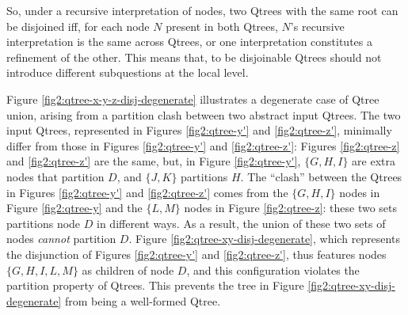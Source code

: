 So, under a recursive interpretation of nodes, two Qtrees with the same root can be disjoined iff, for each node $N$ present in both Qtrees, $N$'s recursive interpretation is the same across Qtrees, or one interpretation constitutes a refinement of the other. This means that, to be disjoinable Qtrees should not introduce different subquestions at the local level.

Figure \ref{fig2:qtree-x-y-z-disj-degenerate} illustrates a degenerate case of Qtree union, arising from a partition clash between two abstract input Qtrees. The two input Qtrees, represented in Figures \ref{fig2:qtree-y'} and \ref{fig2:qtree-z'}, minimally differ from those in Figures \ref{fig2:qtree-y'} and \ref{fig2:qtree-z'}: Figures \ref{fig2:qtree-z} and \ref{fig2:qtree-z'} are the same, but, in Figure \ref{fig2:qtree-y'}, $\lbrace G, H, I \rbrace$ are extra nodes that partition $D$, and $\lbrace J, K \rbrace$ partitions $H$. The ``clash'' between the Qtrees in Figures \ref{fig2:qtree-y'} and \ref{fig2:qtree-z'} comes from the $\lbrace G, H, I \rbrace$ nodes in Figure \ref{fig2:qtree-y} and the $\lbrace L, M \rbrace$ nodes in Figure \ref{fig2:qtree-z}: these two sets partitions node $D$ in different ways. As a result, the union of these two sets of nodes \textit{cannot} partition $D$. Figure \ref{fig2:qtree-xy-disj-degenerate}, which represents the disjunction of Figures \ref{fig2:qtree-y'} and \ref{fig2:qtree-z'}, thus features nodes $\lbrace G, H, I, L, M \rbrace$ as children of node $D$, and this configuration violates the partition property of Qtrees. This prevents the tree in Figure \ref{fig2:qtree-xy-disj-degenerate} from being a well-formed Qtree. 

